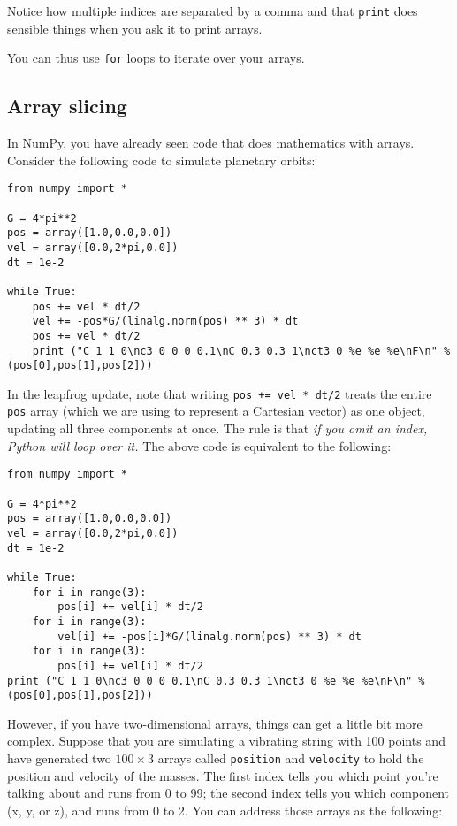 \documentclass[12ampt]{article}
\begin{document}
Notice how multiple indices are separated by a comma and that \verb|print| does sensible things when you ask it to print arrays.

You can thus use {\tt for} loops to iterate over your arrays.


\subsection{Array slicing}

In NumPy, you have already seen code that does mathematics with arrays. Consider the following code to simulate planetary orbits:

\begin{verbatim}
from numpy import *

G = 4*pi**2
pos = array([1.0,0.0,0.0])
vel = array([0.0,2*pi,0.0])
dt = 1e-2

while True:
    pos += vel * dt/2
    vel += -pos*G/(linalg.norm(pos) ** 3) * dt
    pos += vel * dt/2
    print ("C 1 1 0\nc3 0 0 0 0.1\nC 0.3 0.3 1\nct3 0 %e %e %e\nF\n" % (pos[0],pos[1],pos[2]))
\end{verbatim}

In the leapfrog update, note that writing \verb|pos += vel * dt/2| treats the entire \verb|pos| array (which we are using to represent a Cartesian vector) as one object, updating all three components at once. The rule is that {\it if you omit an index, Python will loop over it.} The above code is equivalent to the following:

\begin{verbatim}
from numpy import *

G = 4*pi**2
pos = array([1.0,0.0,0.0])
vel = array([0.0,2*pi,0.0])
dt = 1e-2

while True:
    for i in range(3):
        pos[i] += vel[i] * dt/2
    for i in range(3):
        vel[i] += -pos[i]*G/(linalg.norm(pos) ** 3) * dt
    for i in range(3):
        pos[i] += vel[i] * dt/2
print ("C 1 1 0\nc3 0 0 0 0.1\nC 0.3 0.3 1\nct3 0 %e %e %e\nF\n" % (pos[0],pos[1],pos[2]))
\end{verbatim}

However, if you have two-dimensional arrays, things can get a little bit more complex. Suppose that you are simulating a vibrating string with 100 points and have generated two $100 \times 3$ arrays called \verb|position| and \verb|velocity| to hold the position and velocity of the masses. The first index tells you which point you're talking about and runs from 0 to 99; the second index tells you which component (x, y, or z), and runs from 0 to 2. You can address those arrays as the following:
\end{document}
